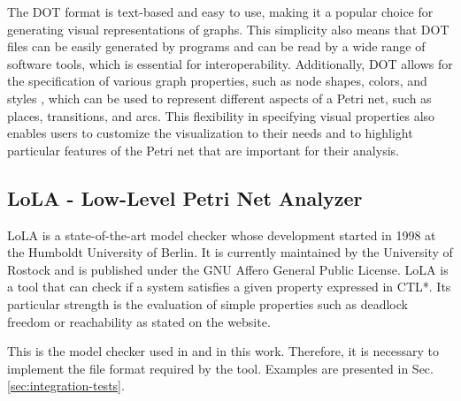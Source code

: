 The DOT format is text-based and easy to use,
making it a popular choice for generating visual representations of graphs.
This simplicity also means that DOT files can be easily generated by programs
and can be read by a wide range of software tools,
which is essential for interoperability.
Additionally, DOT allows for the specification of various graph properties,
such as node shapes, colors, and styles \cite{dot2015},
which can be used to represent different aspects of a Petri net,
such as places, transitions, and arcs.
This flexibility in specifying visual properties also enables users
to customize the visualization to their needs and
to highlight particular features of the Petri net
that are important for their analysis.

\subsection{LoLA - Low-Level Petri Net Analyzer}

\acrfull{LoLA} \cite{schmidt2000lola} is a state-of-the-art model checker
whose development started in 1998 at the Humboldt University of Berlin.
It is currently maintained by the University of
Rostock and is published under the GNU Affero General Public License.
\acrshort{LoLA} is a tool that can check
if a system satisfies a given property expressed in \acrfull{CTL*}.
Its particular strength is the evaluation of simple properties
such as deadlock freedom or reachability as stated on the website.

This is the model checker used in \cite{meyer2020} and in this work.
Therefore, it is necessary to implement the file format required by the tool.
Examples are presented in Sec. \ref{sec:integration-tests}.
